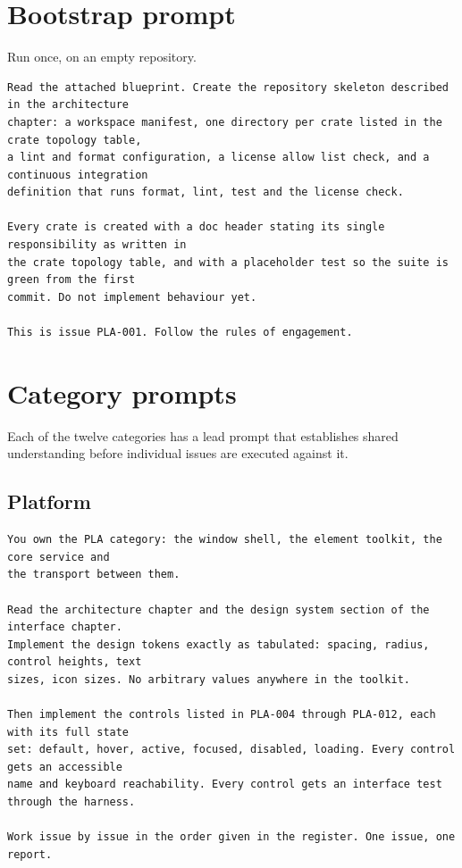 \section{Bootstrap prompt}

Run once, on an empty repository.

\begin{lstlisting}
Read the attached blueprint. Create the repository skeleton described in the architecture
chapter: a workspace manifest, one directory per crate listed in the crate topology table,
a lint and format configuration, a license allow list check, and a continuous integration
definition that runs format, lint, test and the license check.

Every crate is created with a doc header stating its single responsibility as written in
the crate topology table, and with a placeholder test so the suite is green from the first
commit. Do not implement behaviour yet.

This is issue PLA-001. Follow the rules of engagement.
\end{lstlisting}

\section{Category prompts}

Each of the twelve categories has a lead prompt that establishes shared understanding before
individual issues are executed against it.

\subsection{Platform}
\begin{lstlisting}
You own the PLA category: the window shell, the element toolkit, the core service and
the transport between them.

Read the architecture chapter and the design system section of the interface chapter.
Implement the design tokens exactly as tabulated: spacing, radius, control heights, text
sizes, icon sizes. No arbitrary values anywhere in the toolkit.

Then implement the controls listed in PLA-004 through PLA-012, each with its full state
set: default, hover, active, focused, disabled, loading. Every control gets an accessible
name and keyboard reachability. Every control gets an interface test through the harness.

Work issue by issue in the order given in the register. One issue, one report.
\end{lstlisting}

